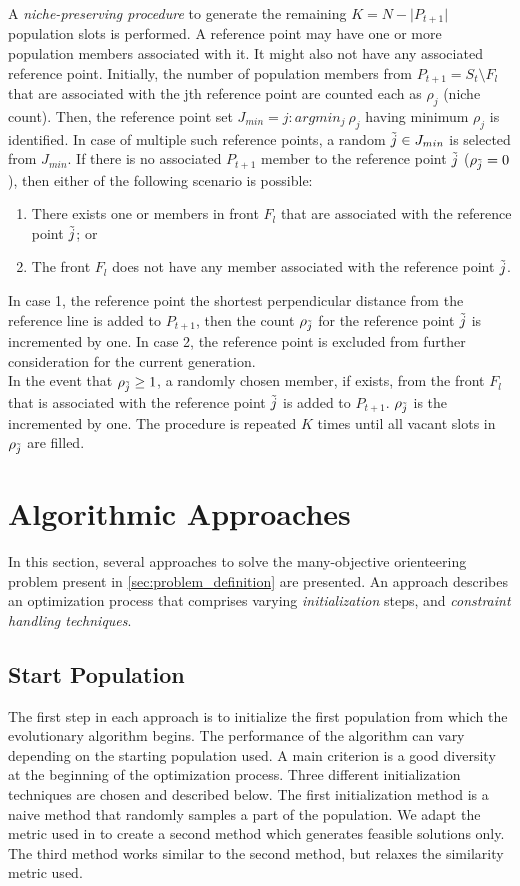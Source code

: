 A \textit{niche-preserving procedure} to generate the remaining $K = N - \lvert P_{t+1} \rvert $ population slots is performed. A reference point may have one or more population members associated with it. It might also not have any associated reference point. Initially, the number of population members from $P_{t+1} = S_t \setminus F_l$ that are associated with the jth reference point are counted each as $\rho_j$ (niche count). Then, the reference point set $J_{min} = {j:argmin_j \ \rho_j}$ having minimum $\rho_j$ is identified. In case of multiple such reference points, a random $\Tilde{j} \in J_{min}$ is selected from $J_{min}$. 
If there is no associated $P_{t+1 }$ member to the reference point $\Tilde{j}$ ($\rho_{\Tilde{j}} = 0$), then either of the following scenario is possible: 
\begin{enumerate}
    \item There exists one or members in front $F_l$ that are associated with the reference point $\Tilde{j}$; or
    \item The front $F_l$ does not have any member associated with the reference point $\Tilde{j}$.
\end{enumerate}
In case 1, the reference point the shortest perpendicular distance from the reference line is added to $P_{t+1}$, then the count $\rho_{\Tilde{j}}$ for the reference point $\Tilde{j}$ is incremented by one. In case 2, the reference point is excluded from further consideration for the current generation.\\
In the event that $\rho_{\Tilde{j}} \geq 1$, a randomly chosen member, if exists, from the front $F_l$ that is associated with the reference point $\Tilde{j}$ is added to $P_{t+1}$. $\rho_{\Tilde{j}}$ is the incremented by one. The procedure is repeated $K$ times until all vacant slots in $\rho_{\Tilde{j}}$ are filled.



\section{Algorithmic Approaches}
In this section, several approaches to solve the many-objective orienteering problem present in \ref{sec:problem_definition} are presented. An approach describes an optimization process that comprises varying \textit{initialization} steps, and \textit{constraint handling techniques}.

\subsection{Start Population}
The first step in each approach is to initialize the first population from which the evolutionary algorithm begins. The performance of the algorithm can vary depending on the starting population used. A main criterion is a good diversity at the beginning of the optimization process. Three different initialization techniques are chosen and described below. The first initialization method is a naive method that randomly samples a part of the population. We adapt the metric used in \parencite{cbrecsys2014} to create a second method which generates feasible solutions only. The third method works similar to the second method, but relaxes the similarity metric used.


